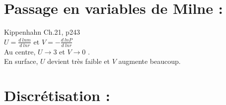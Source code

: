 \documentclass[a4paper,10pt]{article}
\begin{document}
\section{Passage en variables de Milne :}
Kippenhahn Ch.21, p243\\
$U=\frac{d~ln m}{d~ln r} $ et $V=-\frac{d~ln P}{d~lnr}$\\
Au centre, $U \rightarrow 3$ et $V \rightarrow 0$ .\\
En surface, $U$ devient très faible et $V$ augmente beaucoup.

\section{Discrétisation :}
%
%
\end{document}
